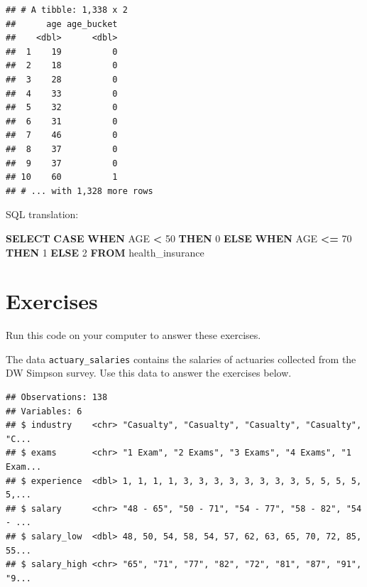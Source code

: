 \documentclass[openany]{book}
\newenvironment{Shaded}{\begin{snugshade}}{\end{snugshade}}
\newcommand{\ControlFlowTok}[1]{\textcolor[rgb]{0.13,0.29,0.53}{\textbf{#1}}}
\newcommand{\DecValTok}[1]{\textcolor[rgb]{0.00,0.00,0.81}{#1}}
\newcommand{\KeywordTok}[1]{\textcolor[rgb]{0.13,0.29,0.53}{\textbf{#1}}}
\newcommand{\NormalTok}[1]{#1}
\newcommand{\OperatorTok}[1]{\textcolor[rgb]{0.81,0.36,0.00}{\textbf{#1}}}
\newcommand{\StringTok}[1]{\textcolor[rgb]{0.31,0.60,0.02}{#1}}
\begin{document}
\begin{verbatim}
## # A tibble: 1,338 x 2
##      age age_bucket
##    <dbl>      <dbl>
##  1    19          0
##  2    18          0
##  3    28          0
##  4    33          0
##  5    32          0
##  6    31          0
##  7    46          0
##  8    37          0
##  9    37          0
## 10    60          1
## # ... with 1,328 more rows
\end{verbatim}

SQL translation:

\begin{Shaded}
\begin{Highlighting}[]
\KeywordTok{SELECT} \ControlFlowTok{CASE} \ControlFlowTok{WHEN}\NormalTok{ AGE }\OperatorTok{<} \DecValTok{50} \ControlFlowTok{THEN} \DecValTok{0}
       \ControlFlowTok{ELSE} \ControlFlowTok{WHEN}\NormalTok{ AGE }\OperatorTok{<=} \DecValTok{70} \ControlFlowTok{THEN} \DecValTok{1}
       \ControlFlowTok{ELSE} \DecValTok{2}
\KeywordTok{FROM}\NormalTok{ health_insurance}
\end{Highlighting}
\end{Shaded}

\hypertarget{exercises}{%
\section{Exercises}\label{exercises}}

Run this code on your computer to answer these exercises.

The data \texttt{actuary\_salaries} contains the salaries of actuaries collected from the DW Simpson survey. Use this data to answer the exercises below.

\begin{Shaded}
\end{Shaded}

\begin{verbatim}
## Observations: 138
## Variables: 6
## $ industry    <chr> "Casualty", "Casualty", "Casualty", "Casualty", "C...
## $ exams       <chr> "1 Exam", "2 Exams", "3 Exams", "4 Exams", "1 Exam...
## $ experience  <dbl> 1, 1, 1, 1, 3, 3, 3, 3, 3, 3, 3, 3, 5, 5, 5, 5, 5,...
## $ salary      <chr> "48 - 65", "50 - 71", "54 - 77", "58 - 82", "54 - ...
## $ salary_low  <dbl> 48, 50, 54, 58, 54, 57, 62, 63, 65, 70, 72, 85, 55...
## $ salary_high <chr> "65", "71", "77", "82", "72", "81", "87", "91", "9...
\end{verbatim}
\end{document}
